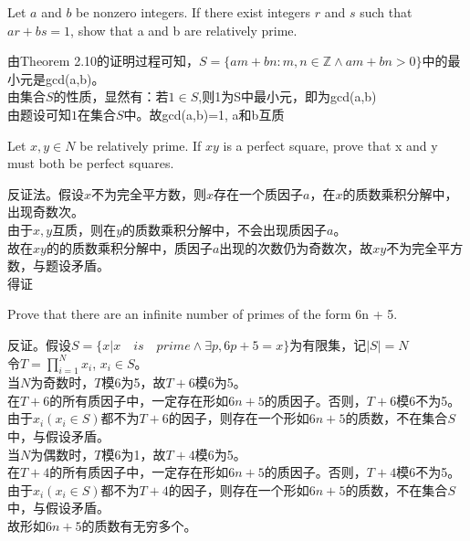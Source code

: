 \documentclass[a4paper, justified]{tufte-handout}
\begin{document}
\begin{problem}[TJ 2-16]
Let $a$ and $b$ be nonzero integers. If there exist integers $r$ and $s$ such that $ar + bs = 1$, show that a and b are relatively prime.
\end{problem}

\begin{solution}
由Theorem 2.10的证明过程可知，$S=\{am+bn:m,n\in\mathbb{Z} \land am + bn >0\}$中的最小元是gcd(a,b)。\\
由集合$S$的性质，显然有：若$1\in S$,则1为S中最小元，即为gcd(a,b)\\
由题设可知$1$在集合$S$中。故gcd(a,b)=1, a和b互质
\end{solution}

\begin{problem}[TJ 2-19]
Let $x,y \in N$ be relatively prime. If $xy$ is a perfect square, prove that x and y must
both be perfect squares.
\end{problem}

\begin{solution}
反证法。假设$x$不为完全平方数，则$x$存在一个质因子$a$，在$x$的质数乘积分解中，出现奇数次。\\
由于$x,y$互质，则在$y$的质数乘积分解中，不会出现质因子$a$。\\
故在$xy$的的质数乘积分解中，质因子$a$出现的次数仍为奇数次，故$xy$不为完全平方数，与题设矛盾。\\
得证
\end{solution}

\begin{problem}[TJ 2-29]
Prove that there are an infinite number of primes of the form 6n + 5.
\end{problem}

\begin{solution}
反证。假设$S=\{x | x \quad is \quad prime  \land \exists p, 6p+5 = x\}$为有限集，记$|S|=N$\\
令$T=\prod \limits_{i=1}^{N}x_i$, $x_i\in S$。\\
当$N$为奇数时，$T$模6为5，故$T+6$模6为5。\\
在$T+6$的所有质因子中，一定存在形如$6n+5$的质因子。否则，$T+6$模6不为5。\\
由于$x_i(x_i\in S)$都不为$T+6$的因子，则存在一个形如$6n+5$的质数，不在集合$S$中，与假设矛盾。\\
当$N$为偶数时，$T$模6为1，故$T+4$模6为5。\\
在$T+4$的所有质因子中，一定存在形如$6n+5$的质因子。否则，$T+4$模6不为5。\\
由于$x_i(x_i\in S)$都不为$T+4$的因子，则存在一个形如$6n+5$的质数，不在集合$S$中，与假设矛盾。\\
故形如$6n+5$的质数有无穷多个。
\end{solution}
\end{document}
